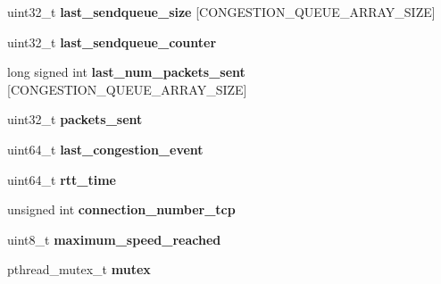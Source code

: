 \begin{DoxyCompactItemize}
\item 
\hypertarget{struct_crypto___connection_a0157f7d2fcd3f9d92521930547ddaae6}{uint32\+\_\+t {\bfseries last\+\_\+sendqueue\+\_\+size} \mbox{[}C\+O\+N\+G\+E\+S\+T\+I\+O\+N\+\_\+\+Q\+U\+E\+U\+E\+\_\+\+A\+R\+R\+A\+Y\+\_\+\+S\+I\+Z\+E\mbox{]}}\label{struct_crypto___connection_a0157f7d2fcd3f9d92521930547ddaae6}

\item 
\hypertarget{struct_crypto___connection_a9fff7889476ca9104b603dd03781e0c9}{uint32\+\_\+t {\bfseries last\+\_\+sendqueue\+\_\+counter}}\label{struct_crypto___connection_a9fff7889476ca9104b603dd03781e0c9}

\item 
\hypertarget{struct_crypto___connection_aa6d1d107adcffe30564bf3837faefca4}{long signed int {\bfseries last\+\_\+num\+\_\+packets\+\_\+sent} \mbox{[}C\+O\+N\+G\+E\+S\+T\+I\+O\+N\+\_\+\+Q\+U\+E\+U\+E\+\_\+\+A\+R\+R\+A\+Y\+\_\+\+S\+I\+Z\+E\mbox{]}}\label{struct_crypto___connection_aa6d1d107adcffe30564bf3837faefca4}

\item 
\hypertarget{struct_crypto___connection_ad51d37ac38989c1d089da8aa0d1bc1d7}{uint32\+\_\+t {\bfseries packets\+\_\+sent}}\label{struct_crypto___connection_ad51d37ac38989c1d089da8aa0d1bc1d7}

\item 
\hypertarget{struct_crypto___connection_ad33f09e937800c05f22fa695e756554d}{uint64\+\_\+t {\bfseries last\+\_\+congestion\+\_\+event}}\label{struct_crypto___connection_ad33f09e937800c05f22fa695e756554d}

\item 
\hypertarget{struct_crypto___connection_ae88ec876060fbc648a4c75ac596137f9}{uint64\+\_\+t {\bfseries rtt\+\_\+time}}\label{struct_crypto___connection_ae88ec876060fbc648a4c75ac596137f9}

\item 
\hypertarget{struct_crypto___connection_a51666aaba0fc5680040fe5bd6778bc50}{unsigned int {\bfseries connection\+\_\+number\+\_\+tcp}}\label{struct_crypto___connection_a51666aaba0fc5680040fe5bd6778bc50}

\item 
\hypertarget{struct_crypto___connection_a8aa9d51e0fa27ad34f8046486d519275}{uint8\+\_\+t {\bfseries maximum\+\_\+speed\+\_\+reached}}\label{struct_crypto___connection_a8aa9d51e0fa27ad34f8046486d519275}

\item 
\hypertarget{struct_crypto___connection_a4acff8232e4aec9cd5c6dc200ac55ef3}{pthread\+\_\+mutex\+\_\+t {\bfseries mutex}}\label{struct_crypto___connection_a4acff8232e4aec9cd5c6dc200ac55ef3}


\end{DoxyCompactItemize}
